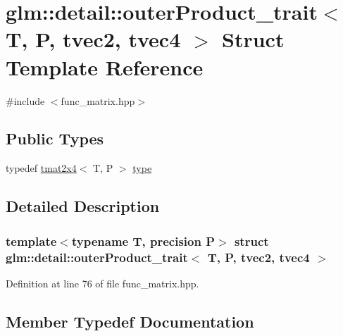 \hypertarget{structglm_1_1detail_1_1outer_product__trait_3_01_t_00_01_p_00_01tvec2_00_01tvec4_01_4}{}\section{glm\+:\+:detail\+:\+:outer\+Product\+\_\+trait$<$ T, P, tvec2, tvec4 $>$ Struct Template Reference}
\label{structglm_1_1detail_1_1outer_product__trait_3_01_t_00_01_p_00_01tvec2_00_01tvec4_01_4}


{\ttfamily \#include $<$func\+\_\+matrix.\+hpp$>$}

\subsection*{Public Types}
\begin{DoxyCompactItemize}
\item 
typedef \hyperlink{structglm_1_1detail_1_1tmat2x4}{tmat2x4}$<$ T, P $>$ \hyperlink{structglm_1_1detail_1_1outer_product__trait_3_01_t_00_01_p_00_01tvec2_00_01tvec4_01_4_a5ca49ab58d1c30d858b622c06147cd57}{type}
\end{DoxyCompactItemize}


\subsection{Detailed Description}
\subsubsection*{template$<$typename T, precision P$>$\newline
struct glm\+::detail\+::outer\+Product\+\_\+trait$<$ T, P, tvec2, tvec4 $>$}



Definition at line 76 of file func\+\_\+matrix.\+hpp.



\subsection{Member Typedef Documentation}
\mbox{\label{structglm_1_1detail_1_1outer_product__trait_3_01_t_00_01_p_00_01tvec2_00_01tvec4_01_4_a5ca49ab58d1c30d858b622c06147cd57}} 
